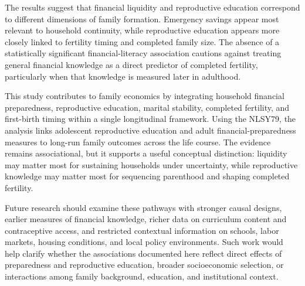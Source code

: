 \documentclass[12pt]{article}
\begin{document}
The results suggest that financial liquidity and reproductive education correspond to different dimensions of family formation. Emergency savings appear most relevant to household continuity, while reproductive education appears more closely linked to fertility timing and completed family size. The absence of a statistically significant financial-literacy association cautions against treating general financial knowledge as a direct predictor of completed fertility, particularly when that knowledge is measured later in adulthood.

This study contributes to family economics by integrating household financial preparedness, reproductive education, marital stability, completed fertility, and first-birth timing within a single longitudinal framework. Using the NLSY79, the analysis links adolescent reproductive education and adult financial-preparedness measures to long-run family outcomes across the life course. The evidence remains associational, but it supports a useful conceptual distinction: liquidity may matter most for sustaining households under uncertainty, while reproductive knowledge may matter most for sequencing parenthood and shaping completed fertility.

Future research should examine these pathways with stronger causal designs, earlier measures of financial knowledge, richer data on curriculum content and contraceptive access, and restricted contextual information on schools, labor markets, housing conditions, and local policy environments. Such work would help clarify whether the associations documented here reflect direct effects of preparedness and reproductive education, broader socioeconomic selection, or interactions among family background, education, and institutional context.



\renewcommand{\refname}{\centering References}



\end{document}
